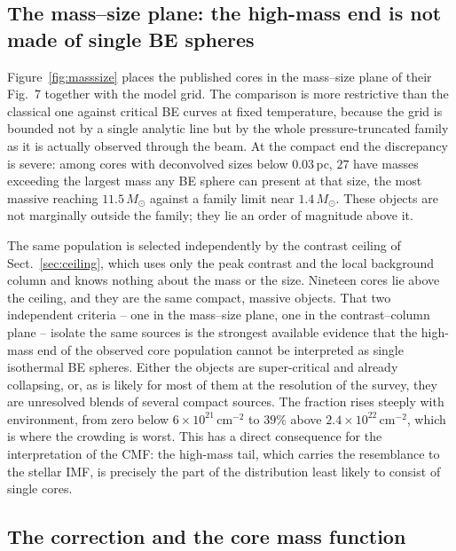 \documentclass[11pt,a4paper]{article}
\newcommand{\msun}{M_{\odot}}
\begin{document}
\subsection{The mass--size plane: the high-mass end is not made of single BE spheres}
\label{sec:masssize}

Figure~\ref{fig:masssize} places the published cores in the mass--size plane
of their Fig.~7 together with the model grid. The comparison is more
restrictive than the classical one against critical BE curves at fixed
temperature, because the grid is bounded not by a single analytic line but by
the whole pressure-truncated family as it is actually observed through the
beam. At the compact end the discrepancy is severe: among cores with
deconvolved sizes below $0.03$\,pc, $27$ have masses exceeding the largest
mass any BE sphere can present at that size, the most massive reaching
$11.5\,\msun$ against a family limit near $1.4\,\msun$. These objects are not
marginally outside the family; they lie an order of magnitude above it.

The same population is selected independently by the contrast ceiling of
Sect.~\ref{sec:ceiling}, which uses only the peak contrast and the local
background column and knows nothing about the mass or the size. Nineteen
cores lie above the ceiling, and they are the same compact, massive objects.
That two independent criteria -- one in the mass--size plane, one in the
contrast--column plane -- isolate the same sources is the strongest available
evidence that the high-mass end of the observed core population cannot be
interpreted as single isothermal BE spheres. Either the objects are
super-critical and already collapsing, or, as is likely for most of them at
the resolution of the survey, they are unresolved blends of several compact
sources. The fraction rises steeply with environment, from zero below
$6\times10^{21}\,\mathrm{cm^{-2}}$ to $39\%$ above
$2.4\times10^{22}\,\mathrm{cm^{-2}}$, which is where the crowding is worst.
This has a direct consequence for the interpretation of the CMF: the
high-mass tail, which carries the resemblance to the stellar IMF, is
precisely the part of the distribution least likely to consist of single
cores.

\subsection{The correction and the core mass function}
\label{sec:cmfcompare}
\end{document}
